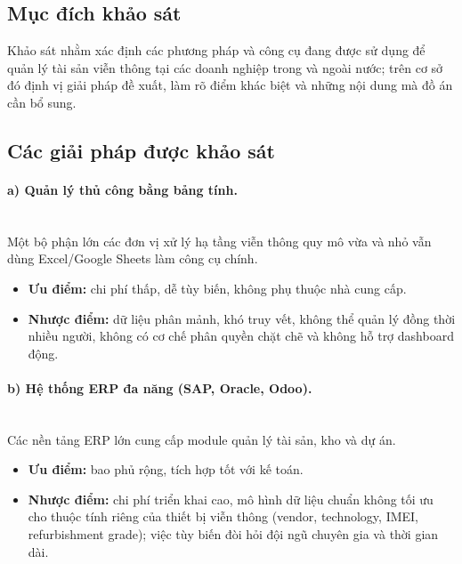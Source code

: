 \subsection{Mục đích khảo sát}
Khảo sát nhằm xác định các phương pháp và công cụ đang được sử dụng để quản lý tài sản viễn thông tại các doanh nghiệp trong và ngoài nước; trên cơ sở đó định vị giải pháp đề xuất, làm rõ điểm khác biệt và những nội dung mà đồ án cần bổ sung.

\subsection{Các giải pháp được khảo sát}

\paragraph{a) Quản lý thủ công bằng bảng tính.}\mbox{}\\
Một bộ phận lớn các đơn vị xử lý hạ tầng viễn thông quy mô vừa và nhỏ vẫn dùng Excel/Google Sheets làm công cụ chính.
\begin{itemize}[leftmargin=1.2cm, nosep, label=\textbullet]
    \item \textbf{Ưu điểm:} chi phí thấp, dễ tùy biến, không phụ thuộc nhà cung cấp.
    \item \textbf{Nhược điểm:} dữ liệu phân mảnh, khó truy vết, không thể quản lý đồng thời nhiều người, không có cơ chế phân quyền chặt chẽ và không hỗ trợ dashboard động.
\end{itemize}

\paragraph{b) Hệ thống ERP đa năng (SAP, Oracle, Odoo).}\mbox{}\\
Các nền tảng ERP lớn cung cấp module quản lý tài sản, kho và dự án.
\begin{itemize}[leftmargin=1.2cm, nosep, label=\textbullet]
    \item \textbf{Ưu điểm:} bao phủ rộng, tích hợp tốt với kế toán.
    \item \textbf{Nhược điểm:} chi phí triển khai cao, mô hình dữ liệu chuẩn không tối ưu cho thuộc tính riêng của thiết bị viễn thông (vendor, technology, IMEI, refurbishment grade); việc tùy biến đòi hỏi đội ngũ chuyên gia và thời gian dài.
\end{itemize}

